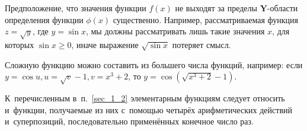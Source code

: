 \begin{Note}
Предположение, что значения функции $f(x)$ не выходят за пределы
$\mathbf{Y}$-области определения функции $\phi(x)$ существенно.
Например, рассматриваемая функция $z = \sqrt{y}$,
где $y = \sin x$, мы должны рассматривать лишь такие значения $x$,
для которых $\sin x \geqslant 0$, иначе выражение $\sqrt{\sin x}$
потеряет смысл.
\end{Note}

\begin{Note}
Сложную функцию можно составить из большего числа функций, например:
если $y = \cos u, u = \sqrt{v}-1, v = x^{3}+2$,
то $y = \cos (\sqrt{x^{3}+2} - 1)$.
\end{Note}

\begin{Note}
К~перечисленным в~п.\ \ref{sec_1_2} элементарным функциям следует относить и~функции,
получаемые из них с~помощью четырёх арифметических действий и~суперпозиций,
последовательно применённых конечное число раз.
\end{Note}

